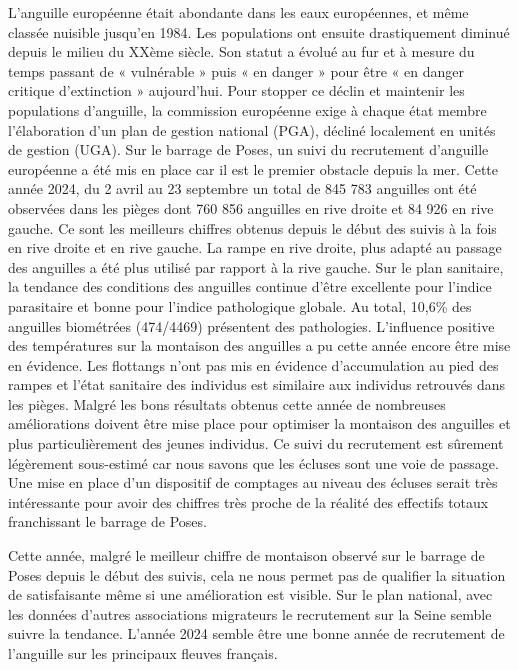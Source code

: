 \documentclass[11pt,titlepage,twoside]{article}\usepackage[]{graphicx}\usepackage[table]{xcolor}
\begin{document}
L’anguille européenne était abondante dans les eaux européennes, et même classée nuisible jusqu’en 1984. Les populations ont ensuite drastiquement diminué depuis le milieu du XXème siècle. Son statut a évolué au fur et à mesure du temps passant de « vulnérable » puis « en danger » pour être « en danger critique d’extinction » aujourd’hui. Pour stopper ce déclin et maintenir les populations d’anguille, la commission européenne exige à chaque état membre l’élaboration d’un plan de gestion national (PGA), décliné localement en unités de gestion (UGA). Sur le barrage de Poses, un suivi du recrutement d’anguille européenne a été mis en place car il est le premier obstacle depuis la mer. Cette année 2024, du 2 avril au 23 septembre un total de 845 783 anguilles ont été observées dans les pièges dont 760 856 anguilles en rive droite et 84 926 en rive gauche. Ce sont les meilleurs chiffres obtenus depuis le début des suivis à la fois en rive droite et en rive gauche. La rampe en rive droite, plus adapté au passage des anguilles a été plus utilisé par rapport à la rive gauche. Sur le plan sanitaire, la tendance des conditions des anguilles continue d’être excellente pour l’indice parasitaire et bonne pour l’indice pathologique globale. Au total, 10,6\% des anguilles biométrées (474/4469) présentent des pathologies. L’influence positive des températures sur la montaison des anguilles a pu cette année encore être mise en évidence. Les flottangs n’ont pas mis en évidence d’accumulation au pied des rampes et l’état sanitaire des individus est similaire aux individus retrouvés dans les pièges. Malgré les bons résultats obtenus cette année de nombreuses améliorations doivent être mise place pour optimiser la montaison des anguilles et plus particulièrement des jeunes individus. Ce suivi du recrutement est sûrement légèrement sous-estimé car nous savons que les écluses sont une voie de passage. Une mise en place d’un dispositif de comptages au niveau des écluses serait très intéressante pour avoir des chiffres très proche de la réalité des effectifs totaux franchissant le barrage de Poses.

\vspace{0.5cm}
Cette année, malgré le meilleur chiffre de montaison observé sur le barrage de Poses depuis le début des suivis, cela ne nous permet pas de qualifier la situation de satisfaisante même si une amélioration est visible. Sur le plan national, avec les données d’autres associations migrateurs le recrutement sur la Seine semble suivre la tendance. L’année 2024 semble être une bonne année de recrutement de l’anguille sur les principaux fleuves français.





\normalsize
\null
\vfill
\end{document}
